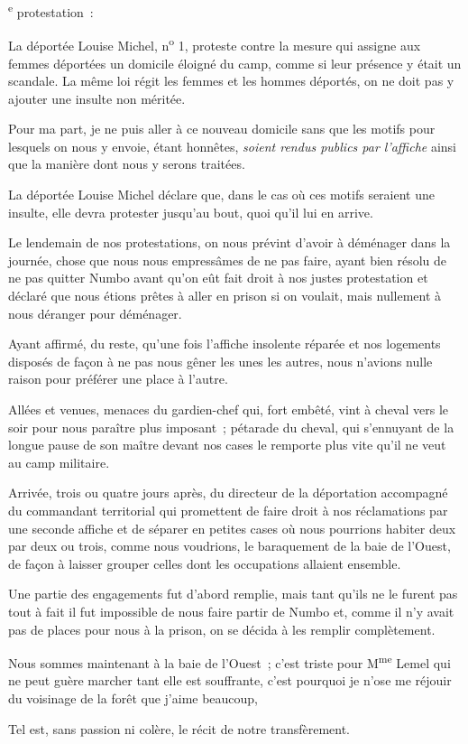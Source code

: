\documentclass[french,twoside]{book} %
\newcommand{\dateline}[1]{\medskip{\RaggedLeft{#1}\par}\bigskip}
\newcommand{\signed}[1]{\bigbreak\filbreak{\raggedleft #1\par}\medskip}
\newenvironment{quoteblock}%
  {\begin{quoting}}
  {\end{quoting}}
\newenvironment{quotebar}{%
    \def\FrameCommand{{\color{rubric!10!}\vrule width 0.5em} \hspace{0.9em}}%
    \def\OuterFrameSep{\itemsep} %
    \MakeFramed {\advance\hsize-\width \FrameRestore}
  }%
  {%
    \endMakeFramed
  }
\renewenvironment{quoteblock}%
  {%
    \savenotes
    \setstretch{0.9}
    \normalfont
    \begin{quotebar}
  }
  {%
    \end{quotebar}
    \spewnotes
  }
\begin{document}
 \textsuperscript{e} protestation :\par

\begin{quoteblock}
 
\dateline{Numbo, 20 mai 1875.}
 \noindent La déportée Louise Michel, n\textsuperscript{o} 1, proteste contre la mesure qui assigne aux femmes déportées un domicile éloigné du camp, comme si leur présence y était un scandale. La même loi régit les femmes et les hommes déportés, on ne doit pas y ajouter une insulte non méritée.\par
 Pour ma part, je ne puis aller à ce nouveau domicile sans que les motifs pour lesquels on nous y envoie, étant honnêtes, \emph{soient rendus publics par l’affiche} ainsi que la manière dont nous y serons traitées.\par
 La déportée Louise Michel déclare que, dans le cas où ces motifs seraient une insulte, elle devra protester jusqu’au bout, quoi qu’il lui en arrive.\par
 

\signed{L{\scshape ouise} M{\scshape ichel}, n\textsuperscript{o} 1.}
 \end{quoteblock}

\noindent Le lendemain de nos protestations, on nous prévint d’avoir à déménager dans la journée, chose que nous nous empressâmes de ne pas faire, ayant bien résolu de ne pas quitter Numbo avant qu’on eût fait droit à nos justes protestation et déclaré que nous étions prêtes à aller en prison si on voulait, mais nullement à nous déranger pour déménager.\par
Ayant affirmé, du reste, qu’une fois l’affiche insolente réparée et nos logements disposés de façon à ne pas nous gêner les unes les autres, nous n’avions nulle raison pour préférer une place à l’autre.\par
Allées et venues, menaces du gardien-chef qui, fort embêté, vint à cheval vers le soir pour nous paraître plus imposant ; pétarade du cheval, qui s’ennuyant de la longue pause de son maître devant nos cases le remporte plus vite qu’il ne veut au camp militaire.\par
 Arrivée, trois ou quatre jours après, du directeur de la déportation accompagné du commandant territorial qui promettent de faire droit à nos réclamations par une seconde affiche et de séparer en petites cases où nous pourrions habiter deux par deux ou trois, comme nous voudrions, le baraquement de la baie de l’Ouest, de façon à laisser grouper celles dont les occupations allaient ensemble.\par
Une partie des engagements fut d’abord remplie, mais tant qu’ils ne le furent pas tout à fait il fut impossible de nous faire partir de Numbo et, comme il n’y avait pas de places pour nous à la prison, on se décida à les remplir complètement.\par
Nous sommes maintenant à la baie de l’Ouest ; c’est triste pour M\textsuperscript{me} Lemel qui ne peut guère marcher tant elle est souffrante, c’est pourquoi je n’ose me réjouir du voisinage de la forêt que j’aime beaucoup,\par
Tel est, sans passion ni colère, le récit de notre transfèrement.\par
\end{document}
